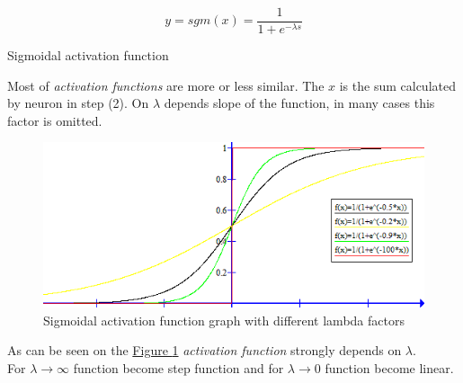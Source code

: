 \begin{mycapequ}[!ht]
    $$y = sgm(x) = \frac{1}{1+e^{-\lambda s}}$$
    \caption{Sigmoidal activation function}
    \label{formula:SigmoidalActivationFunction}
\end{mycapequ}

Most of \textit{activation functions} are more or less similar. The $x$ is the sum calculated by neuron in step (2). On $\lambda$ depends slope of the function, in many cases this factor is omitted. 

\newpage

\begin{figure}[!h]
    \centering
    \includegraphics[scale=1]{Media/sgm_graph.png}
    \caption[Sigmoidal activation function graph]{Sigmoidal activation function graph with different lambda factors}
    \label{fig:SigmoidalFunctionGraph}
\end{figure}

As can be seen on the \hyperref[fig:SigmoidalFunctionGraph]{Figure \ref{fig:SigmoidalFunctionGraph}} \textit{activation function} strongly depends on $\lambda$. \\
For $\lambda \rightarrow \infty$ function become step function and for $\lambda \rightarrow 0$ function become linear.
